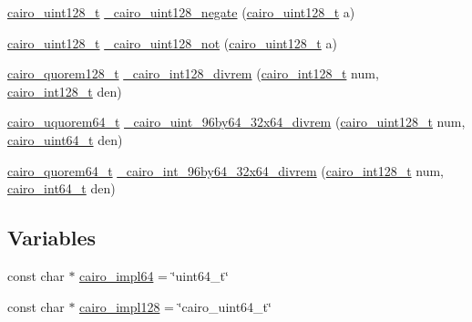 \begin{DoxyCompactItemize}
\item 
\hyperlink{cairo-wideint-private_8h_ab99b9c539c5f08b381ec3797b3fcd872}{cairo\+\_\+uint128\+\_\+t} \hyperlink{cairo-wideint_8c_a29e235c40bd5914350b766b5363c69bc}{\+\_\+cairo\+\_\+uint128\+\_\+negate} (\hyperlink{cairo-wideint-private_8h_ab99b9c539c5f08b381ec3797b3fcd872}{cairo\+\_\+uint128\+\_\+t} a)
\item 
\hyperlink{cairo-wideint-private_8h_ab99b9c539c5f08b381ec3797b3fcd872}{cairo\+\_\+uint128\+\_\+t} \hyperlink{cairo-wideint_8c_a2d895dfd7c293c6fb31d470c534924d3}{\+\_\+cairo\+\_\+uint128\+\_\+not} (\hyperlink{cairo-wideint-private_8h_ab99b9c539c5f08b381ec3797b3fcd872}{cairo\+\_\+uint128\+\_\+t} a)
\item 
\hyperlink{cairo-wideint-private_8h_add8480e15fd3504eb477a983263f0313}{cairo\+\_\+quorem128\+\_\+t} \hyperlink{cairo-wideint_8c_a4c45eec51f48e51ac3d1f592be74b6be}{\+\_\+cairo\+\_\+int128\+\_\+divrem} (\hyperlink{cairo-wideint-private_8h_adb77a91a0053b771957b37c1a822a228}{cairo\+\_\+int128\+\_\+t} num, \hyperlink{cairo-wideint-private_8h_adb77a91a0053b771957b37c1a822a228}{cairo\+\_\+int128\+\_\+t} den)
\item 
\hyperlink{cairo-wideint-private_8h_aab2ad7e0f3441227d9339be2baa8b986}{cairo\+\_\+uquorem64\+\_\+t} \hyperlink{cairo-wideint_8c_a72d333ff8dd3be26ae9886faa0482f80}{\+\_\+cairo\+\_\+uint\+\_\+96by64\+\_\+32x64\+\_\+divrem} (\hyperlink{cairo-wideint-private_8h_ab99b9c539c5f08b381ec3797b3fcd872}{cairo\+\_\+uint128\+\_\+t} num, \hyperlink{cairo-wideint-private_8h_addac97960d28a0f1b58a5abefd21b14b}{cairo\+\_\+uint64\+\_\+t} den)
\item 
\hyperlink{cairo-wideint-private_8h_af1cd8d1d4bd4c1ec92c27c22e8f0123b}{cairo\+\_\+quorem64\+\_\+t} \hyperlink{cairo-wideint_8c_a307256586e076d6bc121ac1946233e8d}{\+\_\+cairo\+\_\+int\+\_\+96by64\+\_\+32x64\+\_\+divrem} (\hyperlink{cairo-wideint-private_8h_adb77a91a0053b771957b37c1a822a228}{cairo\+\_\+int128\+\_\+t} num, \hyperlink{cairo-wideint-private_8h_a31b93307f43703e28eef43fad0166834}{cairo\+\_\+int64\+\_\+t} den)
\end{DoxyCompactItemize}
\subsection*{Variables}
\begin{DoxyCompactItemize}
\item 
const char $\ast$ \hyperlink{cairo-wideint_8c_a49cff5896e8f00bbdd461db2f8024ea1}{cairo\+\_\+impl64} = \char`\"{}uint64\+\_\+t\char`\"{}
\item 
const char $\ast$ \hyperlink{cairo-wideint_8c_a660c34af82df7595e1a029af6c5f799f}{cairo\+\_\+impl128} = \char`\"{}cairo\+\_\+uint64\+\_\+t\char`\"{}
\end{DoxyCompactItemize}


